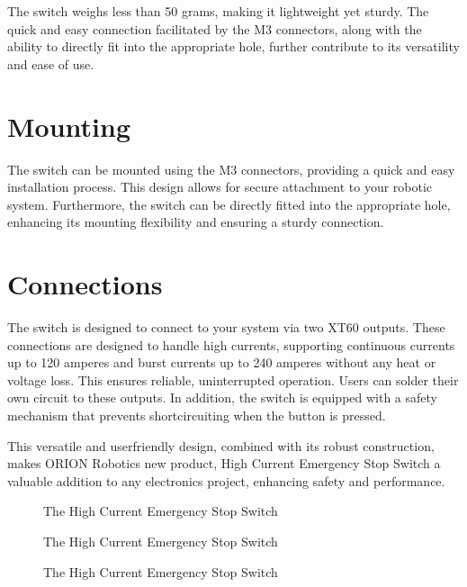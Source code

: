 \documentclass[letterpaper,10pt,english]{sphinxmanual}
\let\sphinxpxdimen\pdfpxdimen\else\newdimen\sphinxpxdimen
\begin{document}
\sphinxAtStartPar
The switch weighs less than 50 grams, making it lightweight yet sturdy. The quick and easy connection facilitated by the M3 connectors, along with the ability to directly fit into the appropriate hole, further contribute to its versatility and ease of use.


\section{Mounting}
\label{\detokenize{design_and_dimensions:mounting}}
\sphinxAtStartPar
The switch can be mounted using the M3 connectors, providing a quick and easy installation process. This design allows for secure attachment to your robotic system. Furthermore, the switch can be directly fitted into the appropriate hole, enhancing its mounting flexibility and ensuring a sturdy connection.


\section{Connections}
\label{\detokenize{design_and_dimensions:connections}}
\sphinxAtStartPar
The switch is designed to connect to your system via two XT60 outputs. These connections are designed to handle high currents, supporting continuous currents up to 120 amperes and burst currents up to 240 amperes without any heat or voltage loss. This ensures reliable, uninterrupted operation. Users can solder their own circuit to these outputs. In addition, the switch is equipped with a safety mechanism that prevents short\sphinxhyphen{}circuiting when the button is pressed.

\sphinxAtStartPar
This versatile and user\sphinxhyphen{}friendly design, combined with its robust construction, makes ORION Robotics new product, High Current Emergency Stop Switch a valuable addition to any electronics project, enhancing safety and performance.

\begin{figure}[htbp]
\centering
\capstart

\noindent\sphinxincludegraphics[width=800\sphinxpxdimen]{{sw2}.jpg}
\caption{The High Current Emergency Stop Switch}\label{\detokenize{design_and_dimensions:id1}}\end{figure}

\begin{figure}[htbp]
\centering
\capstart

\noindent\sphinxincludegraphics[width=800\sphinxpxdimen]{{sw3}.jpg}
\caption{The High Current Emergency Stop Switch}\label{\detokenize{design_and_dimensions:id2}}\end{figure}

\begin{figure}[htbp]
\centering
\capstart

\noindent\sphinxincludegraphics[width=800\sphinxpxdimen]{{sw4}.jpg}
\caption{The High Current Emergency Stop Switch}\label{\detokenize{design_and_dimensions:id3}}\end{figure}



\renewcommand{\indexname}{Index}
\printindex
\end{document}
